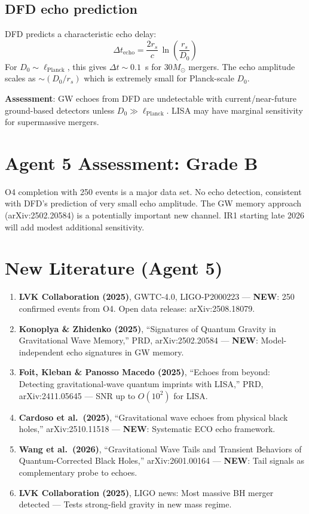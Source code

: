 \documentclass[11pt,a4paper]{article}
\newcommand{\NEW}{\textcolor{dfdblue}{\textbf{NEW}}}
\begin{document}
\subsection{DFD echo prediction}

DFD predicts a characteristic echo delay:
\begin{equation}
\Delta t_{\text{echo}} = \frac{2 r_s}{c}\,\ln\left(\frac{r_s}{D_0}\right)
\end{equation}
For $D_0 \sim \ell_{\text{Planck}}$, this gives $\Delta t \sim 0.1$~s for $30 M_\odot$ mergers. The echo amplitude scales as $\sim (D_0/r_s)$ which is extremely small for Planck-scale $D_0$.

\textbf{Assessment}: GW echoes from DFD are undetectable with current/near-future ground-based detectors unless $D_0 \gg \ell_{\text{Planck}}$. LISA may have marginal sensitivity for supermassive mergers.

\section{Agent 5 Assessment: Grade B}

O4 completion with 250 events is a major data set. No echo detection, consistent with DFD's prediction of very small echo amplitude. The GW memory approach (arXiv:2502.20584) is a potentially important new channel. IR1 starting late 2026 will add modest additional sensitivity.

\section{New Literature (Agent 5)}

\begin{enumerate}
\item \textbf{LVK Collaboration (2025)}, GWTC-4.0, LIGO-P2000223 --- \NEW: 250 confirmed events from O4. Open data release: arXiv:2508.18079.

\item \textbf{Konoplya \& Zhidenko (2025)}, ``Signatures of Quantum Gravity in Gravitational Wave Memory,'' PRD, arXiv:2502.20584 --- \NEW: Model-independent echo signatures in GW memory.

\item \textbf{Foit, Kleban \& Panosso Macedo (2025)}, ``Echoes from beyond: Detecting gravitational-wave quantum imprints with LISA,'' PRD, arXiv:2411.05645 --- SNR up to $O(10^2)$ for LISA.

\item \textbf{Cardoso et al.\ (2025)}, ``Gravitational wave echoes from physical black holes,'' arXiv:2510.11518 --- \NEW: Systematic ECO echo framework.

\item \textbf{Wang et al.\ (2026)}, ``Gravitational Wave Tails and Transient Behaviors of Quantum-Corrected Black Holes,'' arXiv:2601.00164 --- \NEW: Tail signals as complementary probe to echoes.

\item \textbf{LVK Collaboration (2025)}, LIGO news: Most massive BH merger detected --- Tests strong-field gravity in new mass regime.
\end{enumerate}
\end{document}
